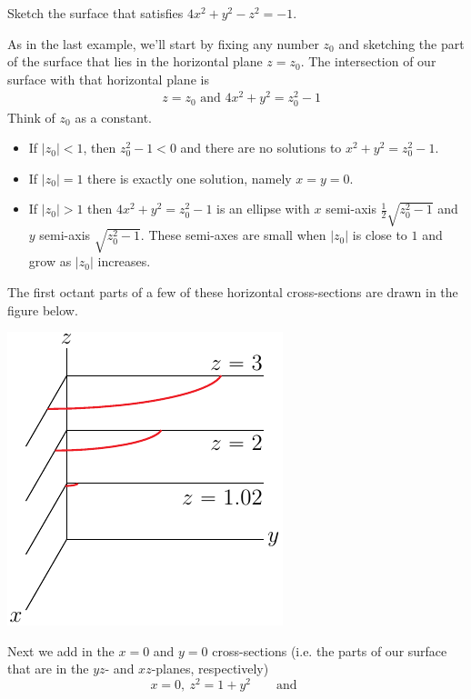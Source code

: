 \bigskip
\begin{eg}[$4x^2+y^2-z^2=-1$]\label{eg hyperboloid two}
\medskip
Sketch the surface that satisfies $4x^2+y^2-z^2=-1$.

\soln As in the last example, we'll start by fixing any number $z_0$ 
and sketching the part of the surface that lies in the horizontal 
plane $z=z_0$. The intersection of our surface with that horizontal plane is 
\begin{align*}
&z=z_0\text{\  \ and\ \ }4x^2+y^2=z_0^2-1
\end{align*}
Think of $z_0$ as a constant. 
\begin{itemize}
\item
If $|z_0|<1$, then $z_0^2-1<0$ and there
are no solutions to $x^2+y^2=z_0^2-1$. 
\item
If $|z_0|=1$ there is exactly one solution, namely $x=y=0$. 
\item
If $|z_0|>1$ then $4x^2+y^2=z_0^2-1$ is an ellipse with 
$x$ semi-axis $\frac{1}{2}\sqrt{z_0^2-1}$ and $y$ semi-axis 
$\sqrt{z_0^2-1}$. These semi-axes are small when $|z_0|$ is close to
$1$ and grow as $|z_0|$ increases.
\end{itemize}
\noindent
The first octant parts of a few of these horizontal cross-sections 
are drawn in the figure below.
\begin{efig}
\begin{center}
   \includegraphics{hyperboloidZXBB.pdf}
\end{center}
\end{efig}
Next we add in the $x=0$ and $y=0$ cross-sections (i.e. the parts of 
our surface that are in the $yz$- and $xz$-planes, respectively)
\begin{equation*}
x=0,\ z^2=1+y^2\qquad\text{and}\qquad

\end{equation*}
\end{eg}
